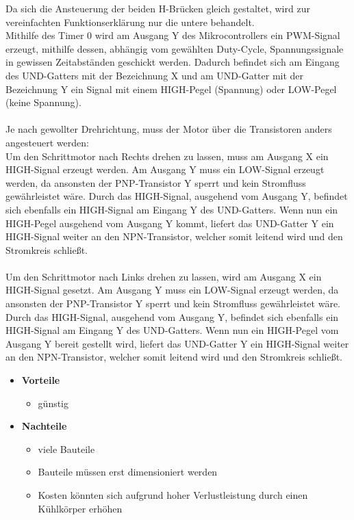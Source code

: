 Da sich die Ansteuerung der beiden H-Brücken gleich gestaltet, wird zur vereinfachten Funktionserklärung nur die untere behandelt. \\
Mithilfe des Timer 0 wird am Ausgang Y des Mikrocontrollers ein PWM-Signal erzeugt, mithilfe dessen, abhängig vom gewählten Duty-Cycle, Spannungssignale in gewissen Zeitabständen geschickt werden.
Dadurch befindet sich am Eingang des UND-Gatters mit der Bezeichnung X und am UND-Gatter mit der Bezeichnung Y ein Signal mit einem HIGH-Pegel (Spannung) oder LOW-Pegel (keine Spannung). \\\\
Je nach gewollter Drehrichtung, muss der Motor über die Transistoren anders angesteuert werden: \\
Um den Schrittmotor nach Rechts drehen zu lassen, muss am Ausgang X ein HIGH-Signal erzeugt werden. Am Ausgang Y muss ein LOW-Signal erzeugt werden, da ansonsten der PNP-Transistor Y sperrt und kein Stromfluss gewährleistet wäre.
Durch das HIGH-Signal, ausgehend vom Ausgang Y, befindet sich ebenfalls ein HIGH-Signal am Eingang Y des UND-Gatters.
Wenn nun ein HIGH-Pegel ausgehend vom Ausgang Y kommt, liefert das UND-Gatter Y ein HIGH-Signal weiter an den NPN-Transistor, welcher somit leitend wird und den Stromkreis schließt. \\\\
Um den Schrittmotor nach Links drehen zu lassen, wird am Ausgang X ein HIGH-Signal gesetzt. Am Ausgang Y muss ein LOW-Signal erzeugt werden, da ansonsten der PNP-Transistor Y sperrt und kein Stromfluss gewährleistet wäre.
Durch das HIGH-Signal, ausgehend vom Ausgang Y, befindet sich ebenfalls ein HIGH-Signal am Eingang Y des UND-Gatters.
Wenn nun ein HIGH-Pegel vom Ausgang Y bereit gestellt wird, liefert das UND-Gatter Y ein HIGH-Signal weiter an den NPN-Transistor, welcher somit leitend wird und den Stromkreis schließt.

\begin{itemize}
    \item \textbf{Vorteile}
    \begin{itemize}
        \item günstig
    \end{itemize}
    \item \textbf{Nachteile}
    \begin{itemize}
        \item viele Bauteile
        \item Bauteile müssen erst dimensioniert werden
        \item Kosten könnten sich aufgrund hoher Verlustleistung durch einen Kühlkörper erhöhen
    \end{itemize}
\end{itemize}

